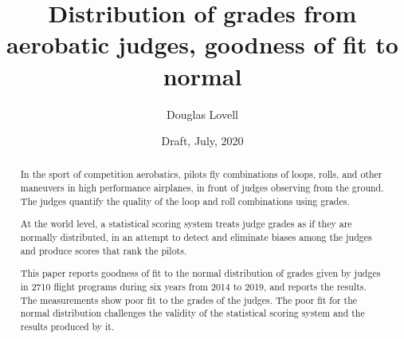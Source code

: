\documentclass[10pt,twocolumn]{article}
\title{Distribution of grades from aerobatic judges, goodness of fit to normal}
\author{Douglas Lovell}
\date{Draft, July, 2020}
\begin{document}
\maketitle
\begin{abstract}
  In the sport of competition aerobatics, pilots fly combinations of loops,
  rolls, and other maneuvers in high performance airplanes, in front of
  judges observing from the ground.
  The judges quantify the quality of the loop and roll combinations
  using grades.

  At the world level, a statistical
  scoring system treats judge grades as if they are normally distributed,
  in an attempt to detect and eliminate biases among the judges
  and produce scores that rank the pilots.

  This paper reports goodness of fit to the normal distribution of
  grades given by judges in 2710 flight programs
  during six years from 2014 to 2019, and reports the results.
  The measurements show poor fit to the grades of the judges.
  The poor fit for the normal distribution challenges
  the validity of the statistical scoring system and the results produced
  by it.
\end{abstract}












\end{document}
